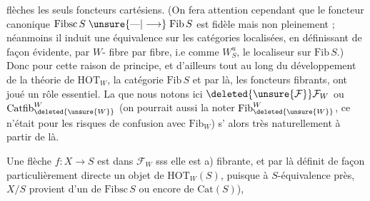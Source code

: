 flèches les seuls foncteurs cartésiens. (On fera
attention cependant que le foncteur canonique
$\mathrm{Fibsc}\,S\mathrel{\unsure{\text{---}|\longrightarrow}}\mathrm{Fib}\,S$ est fidèle mais non pleinement ; néanmoins il induit une équivalence sur les catégories localisées, \deleted{\unsure{)}} en
définissant de façon évidente, par  $W$- fibre par fibre, i.e comme $W_S^u$,
le localiseur  sur $\mathrm{Fib}\,S$.) Donc pour cette
raison de principe, et d'ailleurs tout au
long du développement de la théorie
de $\mathrm{HOT}_W$, la catégorie $\mathrm{Fib}\,S$ et par là,
les foncteurs fibrants, ont joué un rôle
essentiel. La   que nous notons ici
$\deleted{\unsure{\mathcal F}}\mathcal F_W$ ou $\mathrm{Catfib}^{W}_{\deleted{\unsure{W}}}$ (on pourrait aussi la
noter $\mathrm{Fib}^{W}_{\deleted{\unsure{W}}}$,  ce n'était pour les risques
de confusion avec $\mathrm{Fib}_W$)  s'
alors très naturellement à partir de là.

Une flèche $f:X\longrightarrow S$ est dans $\mathcal F_W$ sss
elle est \quad a) fibrante, et par là définit
de façon particulièrement directe un objet
de $\mathrm{HOT}_W(S)$, puisque à $S$-équivalence près, $X/S$
provient d'un   de $\mathrm{Fibsc}\,S$ ou encore de $\mathrm{Cat}(S)$),
